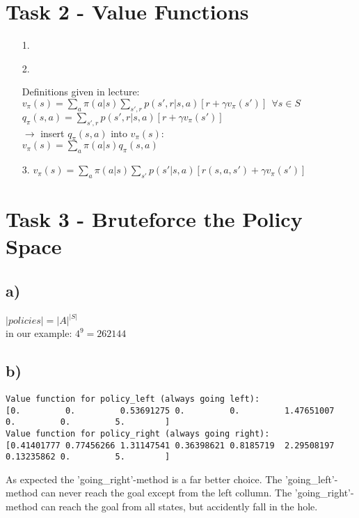 \documentclass[a4paper]{article}
\begin{document}
\section*{Task 2 - Value Functions}

\begin{enumerate}
	\item[1.]
	
	\item[2.]
	
	Definitions given in lecture: \\
	$v_\pi (s) = \sum_{a}\pi (a|s) \sum_{s',r}p(s',r|s,a)[r+ \gamma v_\pi (s')] \ \ \forall s \in S$ \\
	$q_\pi (s,a) = \sum_{s',r}p(s',r|s,a)[r+\gamma v_\pi (s')]$ \\
	$\rightarrow $ insert $q_\pi (s,a)$ into $v_\pi (s)$: \\ 
	$v_\pi (s) = \sum_{a}\pi (a|s) q_\pi (s,a)$
	\item[3.]
	$v_\pi (s) = \sum_{a}\pi (a|s) \sum_{s'}p(s'|s,a)[r(s,a,s')+ \gamma v_\pi (s')]$ \\
\end{enumerate}

\section*{Task 3 - Bruteforce the Policy Space}

\subsection*{a)}
$ |policies|  =  |A|^{|S|} $\\
in our example: $ 4^9 = 262144 $

\subsection*{b)}
\begin{lstlisting}
Value function for policy_left (always going left):
[0.         0.         0.53691275 0.         0.         1.47651007
0.         0.         5.        ]
Value function for policy_right (always going right):
[0.41401777 0.77456266 1.31147541 0.36398621 0.8185719  2.29508197
0.13235862 0.         5.        ]
\end{lstlisting}

As expected the 'going\_right'-method is a far better choice. The 'going\_left'-method can never reach the goal except from the left collumn. The 'going\_right'-method can reach the goal from all states, but accidently fall in the hole.
\end{document}
